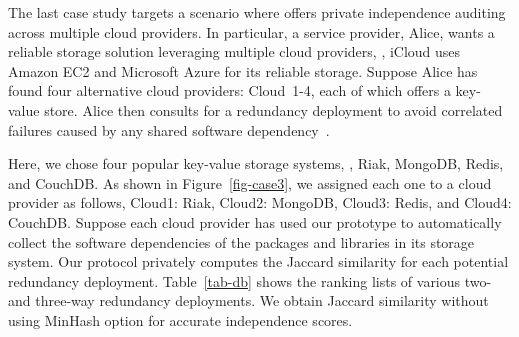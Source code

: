 The last case study targets a scenario where
\app offers private independence
auditing across multiple cloud providers.
In particular, a service provider,
Alice, wants a reliable storage solution
leveraging multiple cloud providers,
\eg, iCloud uses Amazon EC2 and Microsoft Azure for its reliable storage.
Suppose Alice has found four alternative cloud providers: Cloud~1-4,
each of which offers a key-value store.
Alice then consults \app for a redundancy deployment
to avoid correlated failures caused by
any shared software dependency~\cite{greer14heartbleed}.

Here, we chose four popular key-value storage systems, \ie,
Riak, MongoDB, Redis, and CouchDB.
As shown in Figure~\ref{fig-case3},
we assigned each one to a cloud provider as follows,
Cloud1: Riak,
Cloud2: MongoDB,
Cloud3: Redis,
and Cloud4: CouchDB.
Suppose each cloud provider has used
our prototype to automatically collect the software dependencies
of the packages and libraries in its storage system.
Our \pia protocol privately computes the Jaccard similarity
for each potential redundancy deployment.
Table~\ref{tab-db} shows
the ranking lists of various two- and three-way
redundancy deployments.
We obtain Jaccard similarity without
using MinHash option for accurate independence scores.


